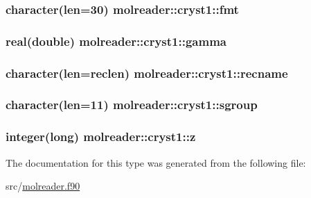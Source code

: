 \hypertarget{structmolreader_1_1cryst1_ab6ab864b10676c184026f298e2298135}{
\subsubsection[{fmt}]{\setlength{\rightskip}{0pt plus 5cm}character(len=30) molreader\-::cryst1\-::fmt\hspace{0.3cm}{\ttfamily [private]}}}\label{structmolreader_1_1cryst1_ab6ab864b10676c184026f298e2298135}
\hypertarget{structmolreader_1_1cryst1_a5830f0c34f6ad1c07482a203f7a7b175}{
\subsubsection[{gamma}]{\setlength{\rightskip}{0pt plus 5cm}real(double) molreader\-::cryst1\-::gamma\hspace{0.3cm}{\ttfamily [private]}}}\label{structmolreader_1_1cryst1_a5830f0c34f6ad1c07482a203f7a7b175}
\hypertarget{structmolreader_1_1cryst1_ae85e046760ae97562351b100fd2c9034}{
\subsubsection[{recname}]{\setlength{\rightskip}{0pt plus 5cm}character(len={\bf reclen}) molreader\-::cryst1\-::recname\hspace{0.3cm}{\ttfamily [private]}}}\label{structmolreader_1_1cryst1_ae85e046760ae97562351b100fd2c9034}
\hypertarget{structmolreader_1_1cryst1_a689985667a15167b26dee5b87a240333}{
\subsubsection[{sgroup}]{\setlength{\rightskip}{0pt plus 5cm}character(len=11) molreader\-::cryst1\-::sgroup\hspace{0.3cm}{\ttfamily [private]}}}\label{structmolreader_1_1cryst1_a689985667a15167b26dee5b87a240333}
\hypertarget{structmolreader_1_1cryst1_ae973dda59fd038efc49c8a247e3e71c9}{
\subsubsection[{z}]{\setlength{\rightskip}{0pt plus 5cm}integer(long) molreader\-::cryst1\-::z\hspace{0.3cm}{\ttfamily [private]}}}\label{structmolreader_1_1cryst1_ae973dda59fd038efc49c8a247e3e71c9}


The documentation for this type was generated from the following file\-:\begin{DoxyCompactItemize}
\item 
src/\hyperlink{molreader_8f90}{molreader.\-f90}\end{DoxyCompactItemize}
